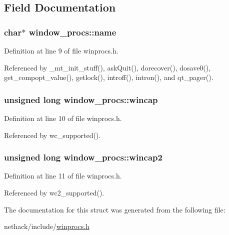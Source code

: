 \subsection{Field Documentation}
\hypertarget{structwindow__procs_a3c3f9beba0ac50aabe7ce172f042e917}{
\subsubsection[{name}]{ char$\ast$ window\+\_\+procs\+::name}}\label{structwindow__procs_a3c3f9beba0ac50aabe7ce172f042e917}


Definition at line 9 of file winprocs.\+h.



Referenced by \+\_\+mt\+\_\+init\+\_\+stuff(), ask\+Quit(), dorecover(), dosave0(), get\+\_\+compopt\+\_\+value(), getlock(), introff(), intron(), and qt\+\_\+pager().

\hypertarget{structwindow__procs_a94cb84de253cd788b6e311796e85e28b}{
\subsubsection[{wincap}]{\setlength{\rightskip}{0pt plus 5cm}unsigned long window\+\_\+procs\+::wincap}}\label{structwindow__procs_a94cb84de253cd788b6e311796e85e28b}


Definition at line 10 of file winprocs.\+h.



Referenced by wc\+\_\+supported().

\hypertarget{structwindow__procs_abd823670901f2e45668dc5b535803b91}{
\subsubsection[{wincap2}]{\setlength{\rightskip}{0pt plus 5cm}unsigned long window\+\_\+procs\+::wincap2}}\label{structwindow__procs_abd823670901f2e45668dc5b535803b91}


Definition at line 11 of file winprocs.\+h.



Referenced by wc2\+\_\+supported().



The documentation for this struct was generated from the following file\+:\begin{DoxyCompactItemize}
\item 
nethack/include/\hyperlink{winprocs_8h}{winprocs.\+h}\end{DoxyCompactItemize}

